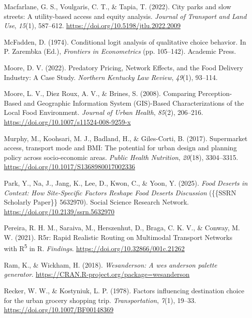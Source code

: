 \documentclass[
  letterpaper,
  number,
  review,
  3p]{elsarticle}
\newlength{\cslhangindent}
\newenvironment{CSLReferences}[2] %
 {\begin{list}{}{%
  \setlength{\itemindent}{0pt}
  \setlength{\leftmargin}{0pt}
  \setlength{\parsep}{0pt}
  \ifodd #1
   \setlength{\leftmargin}{\cslhangindent}
   \setlength{\itemindent}{-1\cslhangindent}
  \fi
  \setlength{\itemsep}{#2\baselineskip}}}
 {\end{list}}
\begin{document}
\begin{CSLReferences}{1}{0}
Macfarlane, G. S., Voulgaris, C. T., \& Tapia, T. (2022). City parks and
slow streets: {A} utility-based access and equity analysis.
\emph{Journal of Transport and Land Use}, \emph{15}(1), 587--612.
\url{https://doi.org/10.5198/jtlu.2022.2009}

McFadden, D. (1974). Conditional logit analysis of qualitative choice
behavior. In P. Zarembka (Ed.), \emph{Frontiers in {Econometrics}} (pp.
105--142). Academic Press.

Moore, D. V. (2022). Predatory {Pricing}, {Network Effects}, and the
{Food Delivery Industry}: {A Case Study}. \emph{Northern Kentucky Law
Review}, \emph{49}(1), 93--114.

Moore, L. V., Diez Roux, A. V., \& Brines, S. (2008). Comparing
{Perception-Based} and {Geographic Information System} ({GIS})-{Based
Characterizations} of the {Local Food Environment}. \emph{Journal of
Urban Health}, \emph{85}(2), 206--216.
\url{https://doi.org/10.1007/s11524-008-9259-x}

Murphy, M., Koohsari, M. J., Badland, H., \& Giles-Corti, B. (2017).
Supermarket access, transport mode and {BMI}: The potential for urban
design and planning policy across socio-economic areas. \emph{Public
Health Nutrition}, \emph{20}(18), 3304--3315.
\url{https://doi.org/10.1017/S1368980017002336}

Park, Y., Na, J., Jang, K., Lee, D., Kwon, C., \& Yoon, Y. (2025).
\emph{Food {Deserts} in {Context}: {How Site-Specific Factors Reshape
Food Deserts Discussion}} (\{\{SSRN Scholarly Paper\}\} 5632970). Social
Science Research Network. \url{https://doi.org/10.2139/ssrn.5632970}

Pereira, R. H. M., Saraiva, M., Herszenhut, D., Braga, C. K. V., \&
Conway, M. W. (2021). R5r: {Rapid Realistic Routing} on {Multimodal
Transport Networks} with {R}{\textsuperscript{5}} in {R}.
\emph{Findings}. \url{https://doi.org/10.32866/001c.21262}

Ram, K., \& Wickham, H. (2018). \emph{Wesanderson: A wes anderson
palette generator}. \url{https://CRAN.R-project.org/package=wesanderson}

Recker, W. W., \& Kostyniuk, L. P. (1978). Factors influencing
destination choice for the urban grocery shopping trip.
\emph{Transportation}, \emph{7}(1), 19--33.
\url{https://doi.org/10.1007/BF00148369}


\end{CSLReferences}
\end{document}
